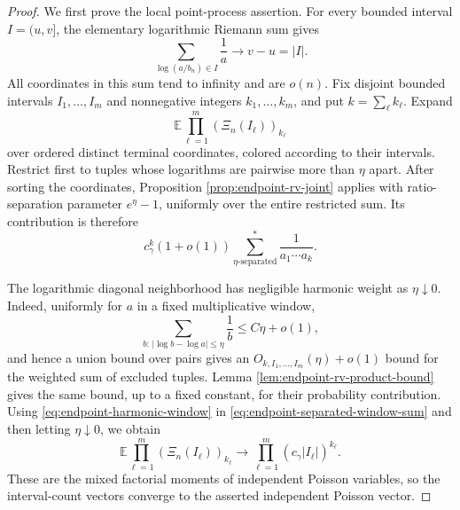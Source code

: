 \documentclass[11pt]{article}
\theoremstyle{remark}
\newcommand{\Ee}{\mathbb E}
\begin{document}
\begin{proof}
We first prove the local point-process assertion.  For every bounded interval
\(I=(u,v]\), the elementary logarithmic Riemann sum gives
\[
        \sum_{\log(a/b_n)\in I}\frac1a\longrightarrow v-u=|I|.
\tag{8.44}\label{eq:endpoint-harmonic-window}
\]
All coordinates in this sum tend to infinity and are \(o(n)\).  Fix disjoint
bounded intervals \(I_1,\ldots,I_m\) and nonnegative integers
\(k_1,\ldots,k_m\), and put \(k=\sum_\ell k_\ell\).  Expand
\[
        \Ee\prod_{\ell=1}^m(\Xi_n(I_\ell))_{k_\ell}
\]
over ordered distinct terminal coordinates, colored according to their
intervals.  Restrict first to tuples whose logarithms are pairwise more than
\(\eta\) apart.  After sorting the coordinates, Proposition
\ref{prop:endpoint-rv-joint} applies with ratio-separation parameter
\(e^\eta-1\), uniformly over the entire restricted sum.  Its contribution is
therefore
\[
        c_\gamma^k(1+o(1))
        \sum_{\eta\text{-separated}}^*
        \frac1{a_1\cdots a_k}.
\tag{8.45}\label{eq:endpoint-separated-window-sum}
\]

The logarithmic diagonal neighborhood has negligible harmonic weight as
\(\eta\downarrow0\).  Indeed, uniformly for \(a\) in a fixed multiplicative
window,
\[
        \sum_{b:\,|\log b-\log a|\le\eta}\frac1b
        \le C\eta+o(1),
\tag{8.46}\label{eq:endpoint-log-diagonal-bound}
\]
and hence a union bound over pairs gives an \(O_{k,I_1,\ldots,I_m}(\eta)+o(1)\)
bound for the weighted sum of excluded tuples.  Lemma
\ref{lem:endpoint-rv-product-bound} gives the same bound, up to a fixed
constant, for their probability contribution.  Using
\eqref{eq:endpoint-harmonic-window} in
\eqref{eq:endpoint-separated-window-sum} and then letting
\(\eta\downarrow0\), we obtain
\[
        \Ee\prod_{\ell=1}^m(\Xi_n(I_\ell))_{k_\ell}
        \longrightarrow
        \prod_{\ell=1}^m(c_\gamma|I_\ell|)^{k_\ell}.
\tag{8.47}\label{eq:endpoint-mixed-window-factorials}
\]
These are the mixed factorial moments of independent Poisson variables, so the
interval-count vectors converge to the asserted independent Poisson vector.


\end{proof}
\end{document}
